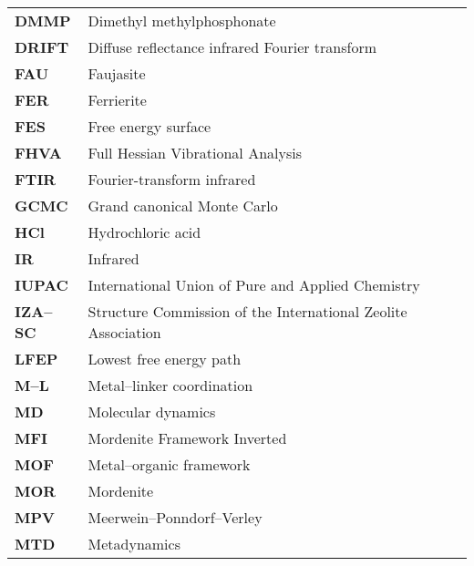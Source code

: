 \begin{longtable}{p{} p{}}
\textbf{DMMP} & Dimethyl methylphosphonate \\
\textbf{DRIFT} & Diffuse reflectance infrared Fourier transform\\
\textbf{FAU} & Faujasite \\
\textbf{FER} & Ferrierite \\
\textbf{FES} & Free energy surface \\
\textbf{FHVA} & Full Hessian Vibrational Analysis \\
\textbf{FTIR} & Fourier-transform infrared \\
\textbf{GCMC} & Grand canonical Monte Carlo \\
\textbf{HCl} & Hydrochloric acid\\
\textbf{IR} & Infrared\\
\textbf{IUPAC} &  International Union of Pure and Applied Chemistry \\
\textbf{IZA--SC} & Structure Commission of the International Zeolite Association
\\
\textbf{LFEP} & Lowest free energy path \\
\textbf{M--L} & Metal--linker coordination \\
\textbf{MD} & Molecular dynamics \\
\textbf{MFI} & Mordenite Framework Inverted \\
\textbf{MOF} & Metal--organic framework \\
\textbf{MOR} & Mordenite \\
\textbf{MPV} & Meerwein--Ponndorf--Verley\\
\textbf{MTD} & Metadynamics \\

\end{longtable}
